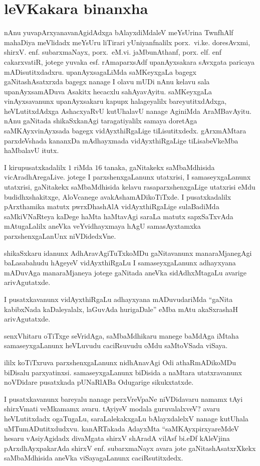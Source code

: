  \chapter*{leVKakara binanxha}

\qquad nAnu yuvapArxyanavanAgidAdxga  bAlayxdiMdaleV meYsUrina TwnfhAlf mahaDiya meVlidadx meYsUru liTirari yUniyanfnalilx porx.~vi.ke. doresAvxmi, shirxV. enf. subarxmaNayx, porx.~eM.vi. jaMbunAthanf, porx. elf. enf cakarxvatiR, jotege yuvaka esf. rAmaparxsAdf upanAyxsakara sAvxgata paricaya mADisutitxdadxru.  upanAyxsagaLiMda saMKeyxgaLa bagegx gaNitashAsatxrxda bagegx nanage I olavu mUDi nAnu kelavu sala upanAyxsamADuva Asakitx hecacxlu sahAyavAyitu. saMKeyxgaLa vinAyxsavanunx upanAyxsakaru kapupx halageyalilx bareyutitxdAdxga, heVLutitxdAdxga AshacxyaRvU kutUhalavU nanage AginiMda AraMBavAyitu. nAnu gaNitada shikaSxkanAgi taragatiyalilx samaya doretAga saMKAyxvinAyxsada bagegx vidAyxthiRgaLige tiLisutitxdedx. gArxmAMtara parxdeVshada kananxDa mAdhayxmada vidAyxthiRgaLige tiLisabeVkeMba haMbalavU itutx.

 I kirupusatxkadalilx $1$ riMda $16$ tanaka, gaNitakekx saMbaMdhisida vicAradhAregaLive. jotege I parxshenxgaLanunx utatxrisi, I samaseyxgaLanunx utatxrisi, gaNitakekx saMbaMdhisida kelavu rasaparxshenxgaLige utatxrisi eMdu budidhxshakitxge, AloVcanege avakAshamADikoTiTxde. I pusatxkadalilx pArxthamika matutx pwrxDhashAlA vidAyxthiRgaLige sulaBadiMda saMkiVNaRteya kaDege haMta haMtavAgi saraLa matutx sapxSaTxvAda mAtugaLalilx aneVka veYvidhayxmaya hAgU samasAyxtamxka parxshenxgaLanUnx niVDidedxVne.

 shikaSxkaru idanunx AdhAravAgiTuTxkoMDu gaNitavanunx manaraMjanegAgi baLasabahudu hAgeyeV vidAyxthiRgaLu I samaseyxgaLanunx adhayxyana mADuvAga manaraMjaneya jotege gaNitada aneVka sidAdhxMtagaLu avarige arivAgutatxde.

 I pusatxkavanunx vidAyxthiRgaLu adhayxyana mADuvudariMda ``gaNita kabibxNada kaDaleyalalx, laGuvAda hurigaDale'' eMba mAtu akaSxrashaH arivAgutatxde.

 senxVhitaru oTiTxge seVridAga, saMbaMdhikaru manege baMdAga iMtaha samaseyxgaLanunx heVLuvudu caciRsuvudu oMdu saMtoVSada viSaya.

  ililx koTiTxruva parxshenxgaLanunx nidhAnavAgi Odi athaRmADikoMDu biDisalu parxyatinxsi. samaseyxgaLanunx biDisida a naMtara utatxravanunx noVDidare pusatxkada pUNaRlABa Odugarige sikukxtatxde.

 I pusatxkavanunx bareyalu nanage perxVreVpaNe niVDidavaru namamx tAyi shirxVmati veMkamamx avaru. tAyiyeV modala guruvalalxveV? avaru heVLutitxdadx ogaTugaLu, saraLalekakxgaLu bAlayxdalelxV nanage kutUhala uMTumADutitxdudxvu. kanARTakada AdayxMta ``saMKAyxpirxyareMdeV hesaru vAsiyAgidadx divaMgata shirxV shAradA vilAsf bi.eDf kAleVjina pArxdhAyxpakarAda shirxV enf. subarxmaNayx avara jote gaNitashAsatxrXkekx saMbaMdhisida aneVka viSayagaLanunx caciRsutitxdedx.

